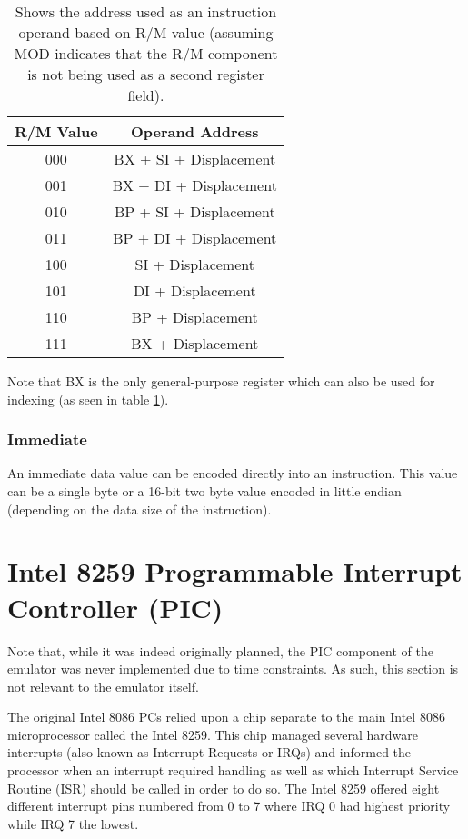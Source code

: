         \begin{table}[h]
            \centering
            \begin{tabular} { | c | c | }
                \hline
                R/M Value & Operand Address \\
                \hline
                000 & BX + SI + Displacement \\
                001 & BX + DI + Displacement \\
                010 & BP + SI + Displacement \\
                011 & BP + DI + Displacement \\
                100 & SI + Displacement \\
                101 & DI + Displacement \\
                110 & BP + Displacement \\
                111 & BX + Displacement \\
                \hline
            \end{tabular}
            \caption{Shows the address used as an instruction operand based on R/M value (assuming MOD indicates that the R/M component is not being used as a second register field).}
            \label{table:rm-values}
        \end{table}

        Note that BX is the only general-purpose register which can also be used for indexing (as seen in table \ref{table:rm-values}).

    \subsubsection{Immediate}
        An immediate data value can be encoded directly into an instruction. This value can be a single byte or a 16-bit two byte value encoded in little endian (depending on the data size of the instruction).

\section{Intel 8259 Programmable Interrupt Controller (PIC)}
    Note that, while it was indeed originally planned, the PIC component of the emulator was never implemented due to time constraints. As such, this section is not relevant to the emulator itself.

    The original Intel 8086 PCs relied upon a chip separate to the main Intel 8086 microprocessor called the Intel 8259. This chip managed several hardware interrupts (also known as Interrupt Requests or IRQs) and informed the processor when an interrupt required handling as well as which Interrupt Service Routine (ISR) should be called in order to do so. The Intel 8259 offered eight different interrupt pins numbered from 0 to 7 where IRQ 0 had highest priority while IRQ 7 the lowest.

